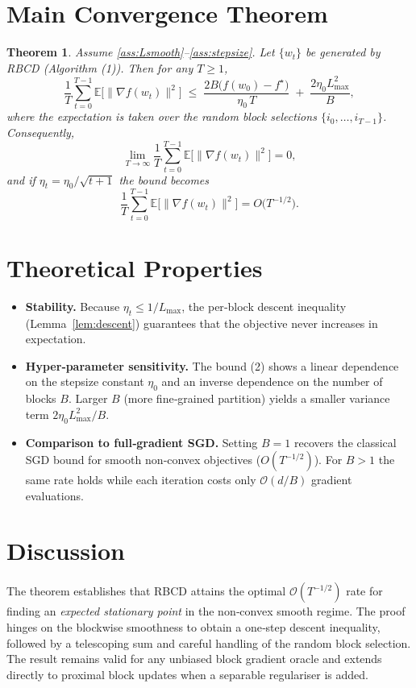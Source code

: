 \documentclass{article}
\newtheorem{theorem}{Theorem}
\newcommand{\E}{\mathbb{E}}
\begin{document}
\section*{Main Convergence Theorem}
\begin{theorem}\label{thm:convergence}
Assume \ref{ass:Lsmooth}–\ref{ass:stepsize}. Let $\{w_t\}$ be generated by
RBCD (Algorithm (1)). Then for any $T\ge 1$,
\[
\frac{1}{T}\sum_{t=0}^{T-1}\E\!\big[\|\nabla f(w_t)\|^{2}\big]
\;\le\;
\frac{2B\big(f(w_0)-f^\star\big)}{\eta_0\,T}
\;+\;
\frac{2\eta_0 L_{\max}^{2}}{B},
\tag{2}
\]
where the expectation is taken over the random block selections
$\{i_0,\dots ,i_{T-1}\}$. Consequently,
\[
\lim_{T\to\infty}\frac{1}{T}\sum_{t=0}^{T-1}\E\!\big[\|\nabla f(w_t)\|^{2}\big]=0,
\]
and if $\eta_t=\eta_0/\sqrt{t+1}$ the bound becomes
\[
\frac{1}{T}\sum_{t=0}^{T-1}\E\!\big[\|\nabla f(w_t)\|^{2}\big]
= O\!\big(T^{-1/2}\big).
\]
\end{theorem}

\section*{Theoretical Properties}
\begin{itemize}
\item \textbf{Stability.} Because $\eta_t\le 1/L_{\max}$, the
  per‑block descent inequality (Lemma~\ref{lem:descent}) guarantees that
  the objective never increases in expectation.
\item \textbf{Hyper‑parameter sensitivity.} The bound (2) shows a
  linear dependence on the stepsize constant $\eta_0$ and an inverse
  dependence on the number of blocks $B$. Larger $B$ (more fine‑grained
  partition) yields a smaller variance term $2\eta_0 L_{\max}^{2}/B$.
\item \textbf{Comparison to full‑gradient SGD.} Setting $B=1$ recovers the
  classical SGD bound for smooth non‑convex objectives
  ($O(T^{-1/2})$). For $B>1$ the same rate holds while each iteration
  costs only $\mathcal{O}(d/B)$ gradient evaluations.
\end{itemize}

\section*{Discussion}
The theorem establishes that RBCD attains the optimal
$\mathcal{O}(T^{-1/2})$ rate for finding an \emph{expected stationary
point} in the non‑convex smooth regime.  The proof hinges on the
blockwise smoothness to obtain a one‑step descent inequality, followed
by a telescoping sum and careful handling of the random block
selection.  The result remains valid for any unbiased block gradient
oracle and extends directly to proximal block updates when a separable
regulariser is added.
\end{document}
